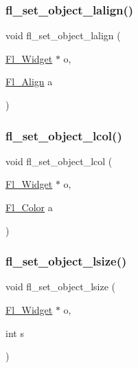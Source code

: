 \subsubsection{\texorpdfstring{fl\+\_\+set\+\_\+object\+\_\+lalign()}{fl\_set\_object\_lalign()}}
{\footnotesize\ttfamily void fl\+\_\+set\+\_\+object\+\_\+lalign (\begin{DoxyParamCaption}\item[{\hyperlink{class_fl___widget}{Fl\+\_\+\+Widget} $\ast$}]{o,  }\item[{\hyperlink{_enumerations_8_h_a44e8bcd1e030e65e4f88cbae64a7c3e3}{Fl\+\_\+\+Align}}]{a }\end{DoxyParamCaption})\hspace{0.3cm}{\ttfamily [inline]}}

\mbox{\label{forms_8_h_a0c5b4fcea85cf32fe17d7a8a4835b76c}} 
\subsubsection{\texorpdfstring{fl\+\_\+set\+\_\+object\+\_\+lcol()}{fl\_set\_object\_lcol()}}
{\footnotesize\ttfamily void fl\+\_\+set\+\_\+object\+\_\+lcol (\begin{DoxyParamCaption}\item[{\hyperlink{class_fl___widget}{Fl\+\_\+\+Widget} $\ast$}]{o,  }\item[{\hyperlink{_enumerations_8_h_a8b762953646f8abee866061f1af78a6a}{Fl\+\_\+\+Color}}]{a }\end{DoxyParamCaption})\hspace{0.3cm}{\ttfamily [inline]}}

\mbox{\label{forms_8_h_a055f2d6f2f25a58ea2b74fc1855d0034}} 
\subsubsection{\texorpdfstring{fl\+\_\+set\+\_\+object\+\_\+lsize()}{fl\_set\_object\_lsize()}}
{\footnotesize\ttfamily void fl\+\_\+set\+\_\+object\+\_\+lsize (\begin{DoxyParamCaption}\item[{\hyperlink{class_fl___widget}{Fl\+\_\+\+Widget} $\ast$}]{o,  }\item[{int}]{s }\end{DoxyParamCaption})\hspace{0.3cm}{\ttfamily [inline]}}

